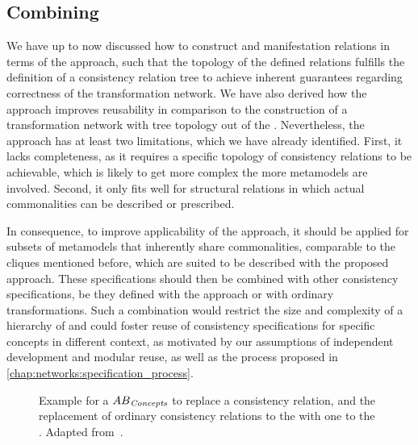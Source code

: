 

\subsection{Combining \Commonalities}

We have up to now discussed how to construct \conceptmetamodels and manifestation relations in terms of the \commonalities approach, such that the topology of the defined relations fulfills the definition of a consistency relation tree to achieve inherent guarantees regarding correctness of the transformation network.
We have also derived how the \commonalities approach improves reusability in comparison to the construction of a transformation network with tree topology out of the \concretemetamodels.
Nevertheless, the approach has at least two limitations, which we have already identified.
First, it lacks completeness, as it requires a specific topology of consistency relations to be achievable, which is likely to get more complex the more metamodels are involved.
Second, it only fits well for structural relations in which actual commonalities can be described or prescribed.

In consequence, to improve applicability of the approach, it should be applied for subsets of metamodels that inherently share commonalities, comparable to the cliques mentioned before, which are suited to be described with the proposed approach.
These specifications should then be combined with other consistency specifications, be they defined with the \commonalities approach or with ordinary transformations.
Such a combination would restrict the size and complexity of a hierarchy of \commonalities and could foster reuse of consistency specifications for specific concepts in different context, as motivated by our assumptions of independent development and modular reuse, as well as the process proposed in \autoref{chap:networks:specification_process}.

\begin{figure}
    \centering
    
    \caption[Partial transformation network of \commonalities]{Example for a \conceptmetamodel $\metamodel{AB}{\mathvariable{Concepts}}$ to replace a consistency relation, and the replacement of ordinary consistency relations to the \concretemetamodels with one to the \conceptmetamodel. Adapted from~.}
    \label{fig:improvement:commonalities_combination_generic}
\end{figure}

